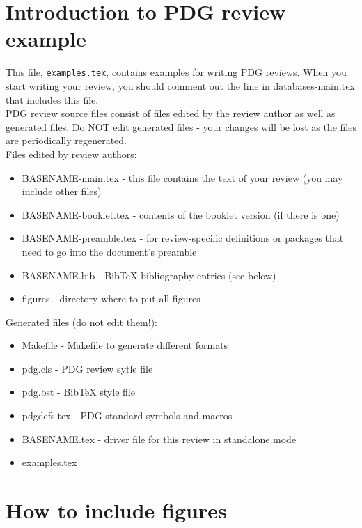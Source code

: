 

\section{Introduction to PDG review example}

This file, {\tt examples.tex}, contains examples for writing PDG
reviews. When you start writing your review, you should
comment out the line in databases-main.tex that includes this file.\\

PDG review source files consist of files edited by the review author as well as generated files. Do NOT edit generated files - your changes will be lost as the files are periodically regenerated.\\
Files edited by review authors:
\begin{itemize}
\item BASENAME-main.tex - this file contains the text of your review (you may include other files)
\item BASENAME-booklet.tex - contents of the booklet version (if there is one)
\item BASENAME-preamble.tex - for review-specific definitions or packages that need to go into the document's preamble
\item BASENAME.bib - BibTeX bibliography entries (see below)
\item figures - directory where to put all figures
\end{itemize}
Generated files (do not edit them!):
\begin{itemize}
\item Makefile - Makefile to generate different formats
\item pdg.cls - PDG review sytle file
\item pdg.bst - BibTeX style file
\item pdgdefs.tex - PDG standard symbols and macros
\item BASENAME.tex - driver file for this review in standalone mode
\item examples.tex
\end{itemize}


\section{How to include figures}

